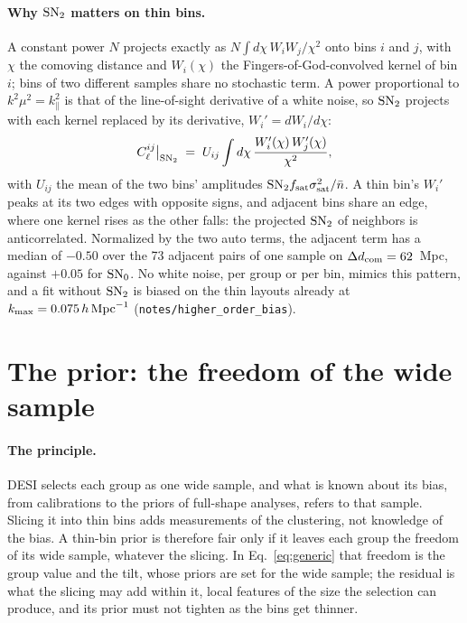 \documentclass[11pt]{article}
\newcommand{\kmax}{k_{\rm max}}
\newcommand{\hMpc}{\,h\,{\rm Mpc}^{-1}}
\newcommand{\SNz}{{\rm SN}_0}
\newcommand{\SNt}{{\rm SN}_2}
\newcommand{\SNtAdj}{-0.50}
\newcommand{\SNzAdj}{+0.05}
\newcommand{\NadjPairs}{73}
\begin{document}
\paragraph{Why $\SNt$ matters on thin bins.}
A constant power $N$ projects exactly as
$N \int d\chi\, W_i W_j/\chi^2$ onto bins $i$ and $j$, with $\chi$ the
comoving distance and $W_i(\chi)$ the Fingers-of-God-convolved kernel
of bin $i$; bins of two different
samples share no stochastic term.  A power proportional to
$k^2\mu^2 = k_\parallel^2$ is that of the line-of-sight derivative of a
white noise, so $\SNt$ projects with each kernel replaced by its
derivative, $W_i' = dW_i/d\chi$:
\begin{equation}
  C_\ell^{ij}\big|_{\SNt} \;=\; U_{ij} \int d\chi\,
  \frac{W_i'(\chi)\,W_j'(\chi)}{\chi^2} ,
  \label{eq:sn2}
\end{equation}
with $U_{ij}$ the mean of the two bins' amplitudes
$\SNt f_{\rm sat}\sigma_{\rm sat}^2/\bar{n}$.  A thin bin's $W_i'$
peaks at its two edges with opposite signs, and adjacent bins share an
edge, where one kernel rises as the other falls: the projected $\SNt$
of neighbors is anticorrelated.  Normalized by the two auto terms, the
adjacent term has a median of $\SNtAdj$ over the \NadjPairs{} adjacent
pairs of one sample on $\Delta d_{\rm com} = 62$~Mpc, against $\SNzAdj$
for $\SNz$.  No white noise, per group or per bin, mimics this pattern,
and a fit without $\SNt$ is biased on the thin layouts already at
$\kmax = 0.075\hMpc$ (\texttt{notes/higher\_order\_bias}).

\section{The prior: the freedom of the wide sample}
\label{sec:prior}

\paragraph{The principle.}
DESI selects each group as one wide sample, and what is known about
its bias, from calibrations to the priors of full-shape analyses,
refers to that sample.  Slicing it into thin bins adds measurements of
the clustering, not knowledge of the bias.  A thin-bin prior is
therefore fair only if it leaves each group the freedom of its wide
sample, whatever the slicing.  In Eq.~\eqref{eq:generic} that freedom
is the group value and the tilt, whose priors are set for the wide
sample; the residual is what the slicing may add within it, local
features of the size the selection can produce, and its prior must not
tighten as the bins get thinner.
\end{document}
